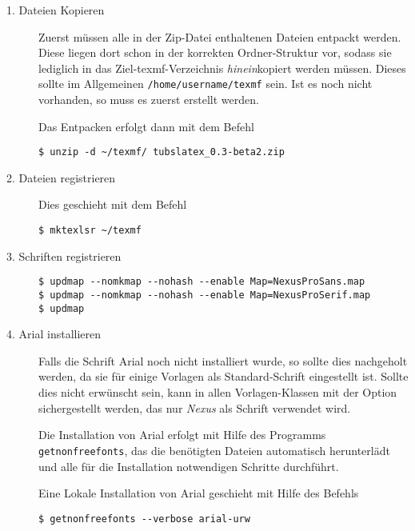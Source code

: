 \begin{description}
  \item[1. Dateien Kopieren] Zuerst müssen alle in der Zip-Datei enthaltenen
    Dateien entpackt werden.
    Diese liegen dort schon in der korrekten Ordner-Struktur vor, sodass
    sie lediglich in das Ziel-texmf-Verzeichnis \emph{hinein}kopiert werden
    müssen. Dieses sollte im Allgemeinen \lstinline{/home/username/texmf}
    sein. Ist es noch nicht vorhanden, so muss es zuerst erstellt werden.

    Das Entpacken erfolgt dann mit dem Befehl
    \begin{lstlisting}[style=cmd]
$ unzip -d ~/texmf/ tubslatex_0.3-beta2.zip
    \end{lstlisting}

  \item[2. Dateien registrieren]
    Dies geschieht mit dem Befehl
    \begin{lstlisting}[style=cmd]
$ mktexlsr ~/texmf
    \end{lstlisting}

  \item[3. Schriften registrieren]\hfill

    \begin{lstlisting}[style=cmd]
$ updmap --nomkmap --nohash --enable Map=NexusProSans.map
$ updmap --nomkmap --nohash --enable Map=NexusProSerif.map
$ updmap
    \end{lstlisting}
    
  \item[4. Arial installieren]
    Falls die Schrift Arial noch nicht installiert wurde, so sollte dies
    nachgeholt werden, da sie für einige Vorlagen als Standard-Schrift
    eingestellt ist. Sollte dies nicht erwünscht sein, kann in allen
    Vorlagen-Klassen mit der Option  sichergestellt werden,
    das nur \emph{Nexus} als Schrift verwendet wird.
    
    Die Installation von Arial erfolgt mit Hilfe des Programms
    \lstinline{getnonfreefonts}, das die benötigten Dateien automatisch
    herunterlädt und alle für die Installation notwendigen Schritte durchführt.
    
    Eine Lokale Installation von Arial geschieht mit Hilfe des Befehls
    \begin{lstlisting}[style=cmd]
$ getnonfreefonts --verbose arial-urw
    \end{lstlisting}
    
\end{description}



